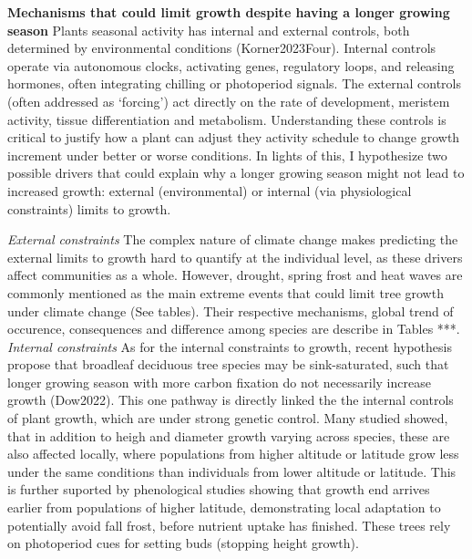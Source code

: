 \documentclass{article}
\begin{document}
\textbf{Mechanisms that could limit growth despite having a longer growing season}
Plants seasonal activity has internal and external controls, both determined by environmental conditions (Korner2023Four). Internal controls operate via autonomous clocks, activating genes, regulatory loops, and releasing hormones, often integrating chilling or photoperiod signals. The external controls (often addressed as ‘forcing’) act directly on the rate of development, meristem activity, tissue differentiation and metabolism. Understanding these controls is critical to justify how a plant can adjust they activity schedule to change growth increment under better or worse conditions. 
In lights of this, I hypothesize two possible drivers that could explain why a longer growing season might not lead to increased growth: external (environmental) \cite{kolar_response_2016} or internal (via physiological constraints)\cite{zohner_effect_2023} limits to growth. 

\textit{External constraints}
The complex nature of climate change makes predicting the external limits to growth hard to quantify at the individual level, as these drivers affect communities as a whole. However, drought, spring frost and heat waves are commonly mentioned as the main extreme events that could limit tree growth under climate change \cite{tyree_xylem_2002, choat_triggers_2018, li_widespread_2023,trenberth_global_2014,intergovernmental_panel_on_climate_change_detection_2014,chiang_evidence_2021,polgar_leafout_2011,reinmann_compensatory_2023} (See tables). Their respective mechanisms, global trend of occurence, consequences and difference among species are describe in Tables ***. \\

\textit{Internal constraints}
As for the internal constraints to growth, recent hypothesis propose that broadleaf deciduous tree species may be sink-saturated, such that longer growing season with more carbon fixation do not necessarily increase growth (Dow2022). This one pathway is directly linked the the internal controls of plant growth, which are under strong genetic control. Many studied showed, that in addition to heigh and diameter growth varying across species, these are also affected locally, where populations from higher altitude or latitude grow less under the same conditions than individuals from lower altitude or latitude. This is further suported by phenological studies showing that growth end arrives earlier from populations of higher latitude, demonstrating local adaptation to potentially avoid fall frost, before nutrient uptake has finished. These trees rely on photoperiod cues for setting buds (stopping height growth). 
\end{document}

